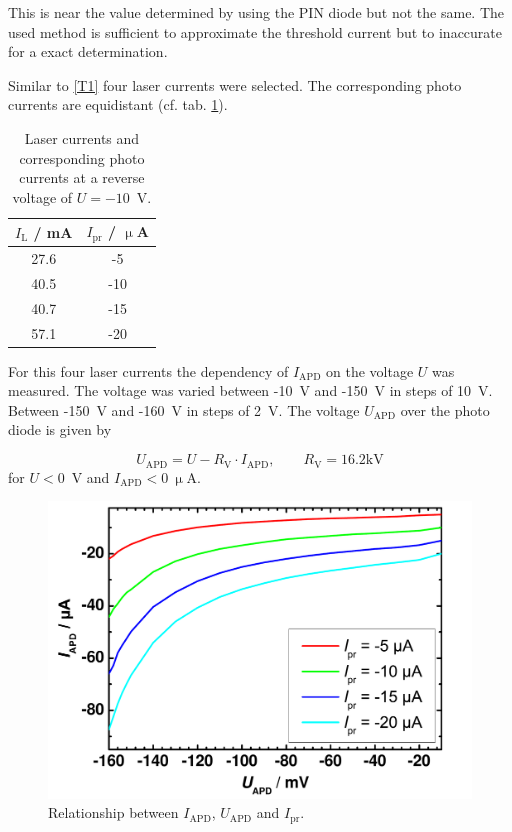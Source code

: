 This is near the value determined by using the PIN diode but not the same. The used method is sufficient to approximate the threshold current but to inaccurate for a exact determination.   



Similar to \ref{T1} four laser currents were selected. The corresponding photo currents are equidistant (cf. tab. \ref{tab:T3_values}).

\begin{table}%
\centering
\caption{Laser currents and corresponding photo currents at a reverse voltage of $U = -10$~V.}


\begin{tabular}{cc}

\toprule
$I_{\mathrm{L}}$ / mA	&	$I_{\mathrm{pr}}$ / $\upmu$A\\

\midrule
27.6 & -5\\
40.5 & -10\\
40.7 & -15\\
57.1 & -20\\

\bottomrule 
\end{tabular}
\label{tab:T3_values}
\end{table}

For this four laser currents the dependency of $I_{\mathrm{APD}}$ on the voltage $U$ was measured. The voltage was varied between -10~V and -150~V in steps of 10~V. Between -150~V and -160~V in steps of 2~V. The voltage $U_{\mathrm{APD}}$ over the photo diode is given by 

\begin{equation}
U_{\mathrm{APD}} = U - R_{\mathrm{V}}\cdot I_{\mathrm{APD}}, \qquad  R_{\mathrm{V}} = 16.2 \mathrm{kV}
\label{eq:}
\end{equation}
for $U < 0$~V and $I_{\mathrm{APD}} < 0~\upmu$A.

\begin{figure}%
\centering
\includegraphics[width=.5\columnwidth]{Grafiken/T3_1.pdf}%
\caption{Relationship between  $I_{\mathrm{APD}}$,  $U_{\mathrm{APD}}$ and  $I_{\mathrm{pr}}$. }%
\label{fig:T3_1}%
\end{figure}

